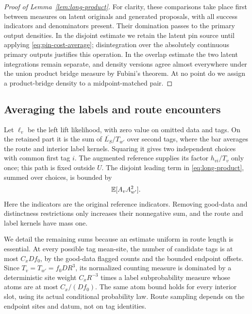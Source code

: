 \begin{proof}[Proof of Lemma~\ref{lem:long-product}]
For clarity, these comparisons take place first between measures
on latent originals and generated proposals, with all success
indicators and denominators present.  Their domination passes
to the primary output densities.  In the disjoint estimate we
retain the latent pin source until applying
\eqref{eq:pin-cost-average}; disintegration over the absolutely
continuous primary outputs justifies this operation.  In the
overlap estimate the two latent integrations remain separate,
and density versions agree almost everywhere under the union
product bridge measure by Fubini's theorem.  At no point do we
assign a product-bridge density to a midpoint-matched pair.
\end{proof}

\subsection{Averaging the labels and route encounters}

Let $\ell_v$ be the left lift likelihood, with zero value on
omitted data and tags.  On the retained part it is the sum of
$\overline{L_S}/T_{w'}$ over second tags, where the bar averages
the route and interior label kernels.  Squaring it gives two
independent choices with common first tag $i$.  The augmented
reference supplies its factor $h_{vi}/T_v$ only once; this path
is fixed outside $U$.  The disjoint leading term in
\eqref{eq:long-product}, summed over choices, is bounded by
\begin{equation}\label{eq:long-leading-term}
 \mathbb E[A_vA_{w'}^2].
\end{equation}
Here the indicators are the original reference indicators.
Removing good-data and distinctness restrictions only increases
their nonnegative sum, and the route and label kernels have mass
one.

We detail the remaining sums because an estimate uniform in route
length is essential.  At every possible tag mean-site, the number
of candidate tags is at most $C_xDf_0$, by the good-data flagged
counts and the bounded endpoint offsets.  Since
$T_v=T_{w'}=f_0DR^3$, its normalized counting measure is dominated
by a deterministic site weight $C_xR^{-3}$ times a label
subprobability measure whose atoms are at most $C_x/(Df_0)$.
The same atom bound holds for every interior slot, using its
actual conditional probability law.  Route sampling depends on
the endpoint sites and datum, not on tag identities.

